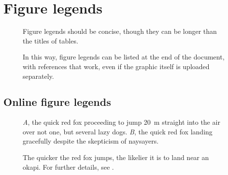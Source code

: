\documentclass[11pt]{article}
\begin{document}
\newpage{}


\section*{Figure legends}

\begin{figure}[h!]
\caption{Figure 
legends should be concise, though they can be longer than the titles of 
tables.}
\label{Fig:OkapiHorn}
\end{figure}

\begin{figure}[h!]
\caption{In this way, figure legends can be listed at the end of the 
document, with references that work, even if the graphic itself is uploaded
separately.}
\label{Fig:AnotherFigure}
\end{figure}

\subsection*{Online figure legends}

\renewcommand{\thefigure}{A\arabic{figure}}
\setcounter{figure}{0}

\begin{figure}[h!]
\caption{\textit{A}, the quick red fox proceeding to jump 20~m straight 
into the air over not one, but several lazy dogs. \textit{B}, the quick 
red fox landing gracefully despite the skepticism of naysayers.}
\label{Fig:Jumps}
\end{figure}

\begin{figure}[h!]
\caption{The quicker the red fox jumps, the likelier it is to land near 
an okapi. For further details, see \citet{LemKapEx07}.}
\label{Fig:JumpsOk}
\end{figure}

\renewcommand{\thefigure}{B\arabic{figure}}
\setcounter{figure}{0}
\end{document}
